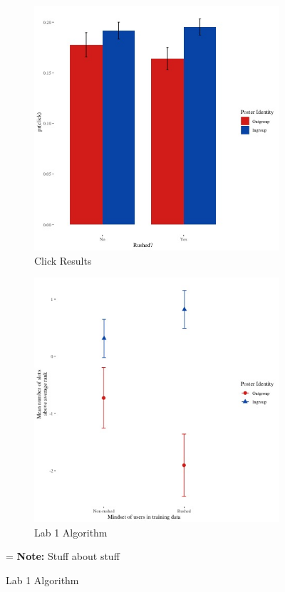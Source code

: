 \documentclass[12pt,letterpaper]{article}
\begin{document}
\begin{figure}[ht]
\caption{Lab Experiment 1 Results}
\label{fig:lab1}
    \begin{subfigure}{.5\textwidth} 
        \centering
        \includegraphics[width=1\linewidth]{Output/Graphs/Experiments/Movie Mechanism/Lax ingroup click rate.jpg}   
        \caption{Click Results}
        \label{fig:lab1_click}
        \end{subfigure}
    \begin{subfigure}{.5\textwidth}
       \centering
       \includegraphics[width=1\linewidth]{Output/Graphs/Experiments/Movie Mechanism/Lax ingroup mean algorithm ranking.jpg} 
        \caption{Lab 1 Algorithm}
         \label{fig:lab1_algo}
    \end{subfigure}
=
\footnotesize \textbf{Note:} Stuff about stuff
\end{figure}
\end{document}
